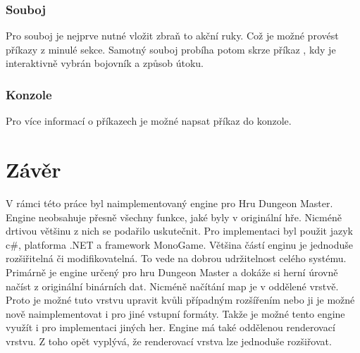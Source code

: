 \subsection{Souboj}
Pro souboj je nejprve nutné vložit zbraň to akční ruky. Což je možné provést příkazy z minulé sekce.
Samotný souboj probíha potom skrze příkaz , kdy je interaktivně vybrán bojovník a způsob útoku.

\subsection{Konzole}
Pro více informací o příkazech je možné napsat příkaz  do konzole.

\chapter*{Závěr}

V rámci této práce byl naimplementovaný engine pro Hru Dungeon Master. Engine 
neobsahuje přesně všechny funkce, jaké byly v originální hře. Nicméně drtivou většinu
z nich se podařilo uskutečnit. Pro implementaci byl použit jazyk c#, platforma .NET
a framework MonoGame. Většina částí enginu je jednoduše rozšiřitelná či modifikovatelná.
To vede na dobrou udržitelnost celého systému. Primárně je engine určený pro hru 
Dungeon Master a dokáže si herní úrovně načíst z originální binárních dat. Nicméně
načítání map je v oddělené vrstvě. Proto je možné tuto vrstvu upravit kvůli případným rozšířením nebo ji je možné
 nově naimplementovat i pro 
jiné vstupní formáty. Takže je možné tento engine využít i pro implementaci jiných her.
Engine má také oddělenou renderovací vrstvu. Z toho opět vyplývá, že renderovací vrstva lze jednoduše
rozšiřovat.


